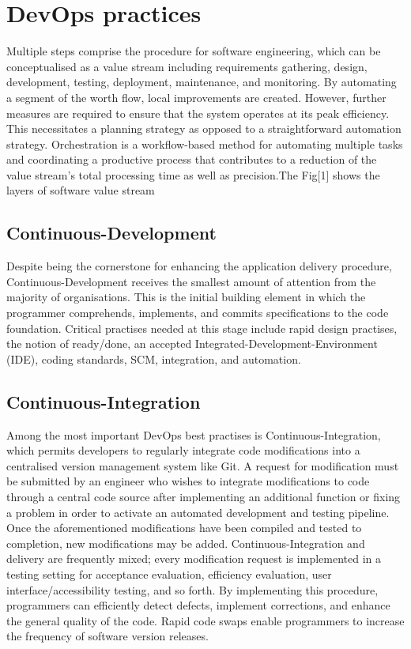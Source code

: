 \documentclass[12pt, letterpaper]{article}
\begin{document}
\section{DevOps practices}

Multiple steps comprise the procedure for software engineering, which can be conceptualised as a value stream including requirements gathering, design, development, testing, deployment, maintenance, and monitoring. By automating a segment of the worth flow, local improvements are created\cite{MP}. However, further measures are required to ensure that the system operates at its peak efficiency. This necessitates a planning strategy as opposed to a straightforward automation strategy. Orchestration is a workflow-based method for automating multiple tasks and coordinating a productive process that contributes to a reduction of the value stream's total processing time as well as precision.The Fig[1] shows the layers of software value stream

\subsection{Continuous-Development}
Despite being the cornerstone for enhancing the application delivery procedure, Continuous-Development receives the smallest amount of attention from the majority of organisations. This is the initial building element in which the programmer comprehends, implements, and commits specifications to the code foundation. Critical practises needed at this stage include rapid design practises, the notion of ready/done, an accepted Integrated-Development-Environment (IDE), coding standards, SCM, integration, and automation\cite{Ghantous}.

\subsection{Continuous-Integration}
Among the most important DevOps best practises is Continuous-Integration, which permits developers to regularly integrate code modifications into a centralised version management system like Git. A request for modification must be submitted by an engineer who wishes to integrate modifications to code through a central code source after implementing an additional function or fixing a problem in order to activate an automated development and testing pipeline.
Once the aforementioned modifications have been compiled and tested to completion, new modifications may be added. Continuous-Integration and delivery are frequently mixed; every modification request is implemented in a testing setting for acceptance evaluation, efficiency evaluation, user interface/accessibility testing, and so forth.
By implementing this procedure, programmers can efficiently detect defects, implement corrections, and enhance the general quality of the code. Rapid code swaps enable programmers to increase the frequency of software version releases\cite{Kang}.
\end{document}
